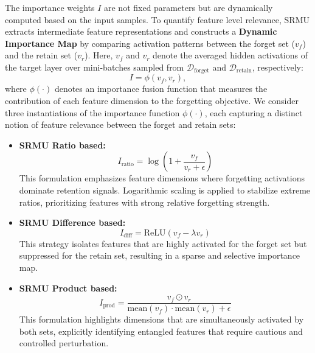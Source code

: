 The importance weights $I$ are not fixed parameters but are dynamically computed based on the input samples.
To quantify feature level relevance, SRMU extracts intermediate feature representations and constructs a \textbf{Dynamic Importance Map} by comparing activation patterns between the forget set ($v_f$) and the retain set ($v_r$). Here, $v_f$ and $v_r$ denote the averaged hidden activations of the target layer
over mini-batches sampled from $\mathcal{D}_{\text{forget}}$ and $\mathcal{D}_{\text{retain}}$, respectively:
\begin{equation}
I = \phi(v_f, v_r),
\label{eq:mapcal}
\end{equation}
where $\phi(\cdot)$ denotes an importance fusion function that measures the contribution of each feature dimension to the forgetting objective.
We consider three instantiations of the importance function $\phi(\cdot)$, each capturing a distinct notion of feature relevance between the forget and retain sets:
\begin{itemize}
    \item \textbf{SRMU Ratio based:}
    \begin{equation*}
    I_{\text{ratio}} = \log\left(1 + \frac{v_f}{v_r + \epsilon}\right)
    \end{equation*}
    This formulation emphasizes feature dimensions where forgetting activations dominate retention signals.
    Logarithmic scaling is applied to stabilize extreme ratios, prioritizing features with strong relative forgetting strength.

    \item \textbf{SRMU Difference based:}
    \begin{equation*}
    I_{\text{diff}} = \text{ReLU}(v_f - \lambda v_r)
    \end{equation*}
    This strategy isolates features that are highly activated for the forget set but suppressed for the retain set, resulting in a sparse and selective importance map.

    \item \textbf{SRMU Product based:}
    \begin{equation*}
    I_{\text{prod}} = \frac{v_f \odot v_r}{\text{mean}(v_f) \cdot \text{mean}(v_r) + \epsilon}
    \end{equation*}
    This formulation highlights dimensions that are simultaneously activated by both sets, explicitly identifying entangled features that require cautious and controlled perturbation.
\end{itemize}

